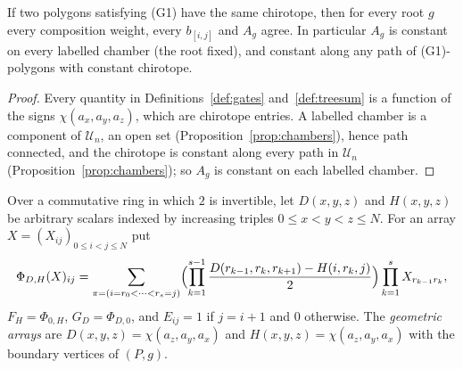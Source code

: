 \begin{proposition}\label{prop:A-chamber}
If two polygons satisfying (G1) have the same chirotope, then for every root
$g$ every composition weight, every $b_{[i,j]}$ and $A_g$ agree. In
particular $A_g$ is constant on every labelled chamber (the root fixed), and
constant along any path of (G1)-polygons with constant chirotope. 
\end{proposition}
\begin{proof}
Every quantity in Definitions~\ref{def:gates} and~\ref{def:treesum} is a
function of the signs $\chi(a_x,a_y,a_z)$, which are chirotope entries. A
labelled chamber is a component of $\mathcal U_n$, an open set
(Proposition~\ref{prop:chambers}), hence path connected, and the chirotope
is constant along every path in $\mathcal U_n$
(Proposition~\ref{prop:chambers}); so $A_g$ is constant on each labelled
chamber.
\end{proof}

\begin{definition}\label{def:nearfar}
Over a commutative ring in which $2$ is invertible, let $D(x,y,z)$ and
$H(x,y,z)$ be arbitrary scalars indexed by increasing triples
$0\leq x<y<z\leq N$. For an array $X=(X_{ij})_{0\leq i<j\leq N}$ put
\[
\Phi_{D,H}(X)_{ij}=\sum_{\pi=(i=r_0<\cdots<r_s=j)}
\Bigl(\prod_{k=1}^{s-1}\frac{D(r_{k-1},r_k,r_{k+1})-H(i,r_k,j)}2\Bigr)
\prod_{k=1}^sX_{r_{k-1}r_k},
\]
$F_H=\Phi_{0,H}$, $G_D=\Phi_{D,0}$, and $E_{ij}=1$ if $j=i+1$ and $0$
otherwise. The \emph{geometric arrays} are $D(x,y,z)=\chi(a_z,a_y,a_x)$ and
$H(x,y,z)=\chi(a_z,a_y,a_x)$ with the boundary vertices of $(P,g)$.
\end{definition}

